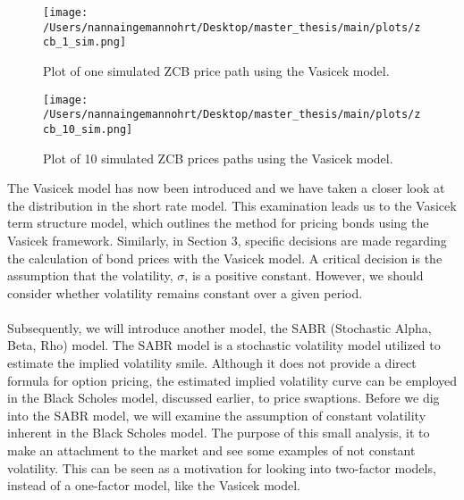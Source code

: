 \noindent
\begin{figure}[H]
    \centering
    \texttt{[image: /Users/nannaingemannohrt/Desktop/master\_thesis/main/plots/zcb\_1\_sim.png]}
    \caption{Plot of one simulated ZCB price path using the Vasicek model.}
    \label{fig:zcb_sim_1_plot}
\end{figure}
\noindent
\begin{figure}[H]
    \centering
    \texttt{[image: /Users/nannaingemannohrt/Desktop/master\_thesis/main/plots/zcb\_10\_sim.png]}
    \caption{Plot of 10 simulated  ZCB prices  paths using the Vasicek model.}
    \label{fig:zcb_sim_10_plot}
\end{figure}
\noindent
The Vasicek model has now been introduced and we have taken a closer look at the distribution in the short rate model. 
This examination leads us to the Vasicek term structure model, which outlines the method for pricing bonds using the 
Vasicek framework. Similarly, in Section 3, specific decisions are made regarding the calculation of bond prices with 
the Vasicek model. A critical decision is the assumption that the volatility, 
$\sigma$, is a positive constant. However, we should consider whether volatility remains constant over a given period.
\\\\
Subsequently, we will introduce another model, the SABR (Stochastic Alpha, Beta, Rho) model. The SABR model is a stochastic volatility model 
utilized to estimate the implied volatility smile. Although it does not provide a direct formula for option pricing, 
the estimated implied volatility curve can be employed in the Black Scholes model, discussed earlier, to price swaptions. 
Before we dig into the SABR model, we will examine the assumption of constant volatility inherent in the Black Scholes model.
The purpose of this small analysis, it to make an attachment to the
market and see some examples of not constant volatility. This can 
be seen as a motivation for looking into two-factor models, 
instead of a one-factor model, like the Vasicek model. 

